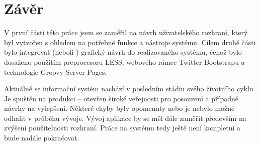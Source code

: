 \chapter{Závěr}

V první části této práce jsem se zaměřil na návrh uživatelského rozhraní, který byl vytvořen s ohledem na potřebné funkce a nástroje systému. Cílem druhé části bylo integrovat (neboli ) grafický návrh do realizovaného systému, čehož bylo dosaženo použitím preprocesoru LESS, webového rámce Twitter Bootstrapu a technologie Groovy Server Pages.

Aktuálně se informační systém nachází v posledním stádiu svého životního cyklu. Je spuštěn na produkci -- otevřen široké veřejnosti pro posouzení a případné návrhy na vylepšení. Některé chyby byly opomenuty nebo je nebylo možné odhalit v průběhu vývoje. Vývoj aplikace by se měl dále zaměřit především na zvýšení použitelnosti rozhraní. Práce na systému tedy ještě není kompletní a bude nadále pokračovat.
